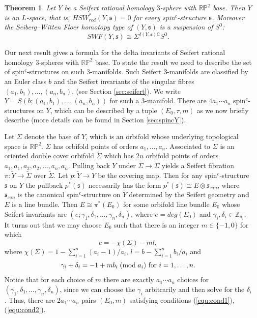 \documentclass{amsart}
\newtheorem{theorem}{Theorem}[section]
\theoremstyle{definition}
\theoremstyle{remark}
\numberwithin{equation}{section}
\begin{document}
\begin{theorem}\label{thm:swfY}
Let $Y$ be a Seifert rational homology $3$-sphere with $\mathbb{RP}^2$ base. Then $Y$ is an $L$-space, that is, $HSW^*_{red}(Y , \mathfrak{s}) = 0$ for every spin$^c$-structure $\mathfrak{s}$. Moreover the Seiberg--Witten Floer homotopy type of $(Y,\mathfrak{s})$ is a suspension of $S^0$:
\[
SWF(Y , \mathfrak{s}) \cong \Sigma^{\delta(Y,\mathfrak{s})\mathbb{C}} S^0.
\]
\end{theorem}

Our next result gives a formula for the delta invariants of Seifert rational homology $3$-spheres with $\mathbb{RP}^2$ base. To state the result we need to describe the set of spin$^c$-structures on such $3$-manifolds. Such Seifert $3$-manifolds are classified by an Euler class $b$ and the Seifert invariants of the singular fibres $(a_1,b_1), \dots , (a_n,b_n)$, (see Section \ref{sec:seifert}). We write $Y = S(b ; (a_1,b_1) , \dots , (a_n,b_n))$ for such a $3$-manifold. There are $4a_1 \cdots a_n$ spin$^c$-structures on $Y$, which can be described by a tuple $(E_0 , \tau , m)$ as we now briefly describe (more details can be found in Section \ref{sec:spincY}).

Let $\Sigma$ denote the base of $Y$, which is an orbifold whose underlying topological space is $\mathbb{RP}^2$. $\Sigma$ has orbifold points of orders $a_1, \dots , a_n$. Associated to $\Sigma$ is an oriented double cover orbifold $\widetilde{\Sigma}$ which has $2n$ orbifold points of orders $a_1,a_1,a_2,a_2 , \dots , a_n,a_n$. Pulling back $Y$ under $\widetilde{\Sigma} \to \Sigma$ yields a Seifert fibration $\pi : \widetilde{Y} \to \widetilde{\Sigma}$ over $\widetilde{\Sigma}$. Let $p : \widetilde{Y} \to Y$ be the covering map. Then for any spin$^c$-structure $\mathfrak{s}$ on $Y$ the pullback $p^*(\mathfrak{s})$ necessarily has the form $p^*(\mathfrak{s}) \cong E \otimes \mathfrak{s}_{can}$, where $\mathfrak{s}_{can}$ is the canonical spin$^c$-structure on $\widetilde{Y}$ determined by the Seifert geometry and $E$ is a line bundle. Then $E \cong \pi^*(E_0)$ for some orbifold line bundle $E_0$ whose Seifert invariants are $( e ; \gamma_1 , \delta_1 , \dots , \gamma_n , \delta_n)$, where $e = deg(E_0)$ and $\gamma_i, \delta_i \in \mathbb{Z}_{a_i}$. It turns out that we may choose $E_0$ such that there is an integer $m \in \{-1,0\}$ for which
\begin{equation}\label{equ:cond1}
e = -\chi(\Sigma) - ml,
\end{equation}
where $\chi(\Sigma) = 1 - \sum_{i=1}^n (a_i - 1)/a_i$, $l = b - \sum_{i=1}^{n} b_i/a_i$ and
\begin{equation}\label{equ:cond2}
\gamma_ i + \delta_i = -1 + m b_i \; ({\rm mod} \; a_i) \text{ for } i = 1, \dots , n.
\end{equation}
Notice that for each choice of $m$ there are exactly $a_1 \cdots a_n$ choices for $(\gamma_1 , \delta_1 , \dots , \gamma_n , \delta_n)$, since we can choose the $\gamma_i$ arbitrarily and then solve for the $\delta_i$. Thus, there are $2a_1 \cdots a_n$ pairs $(E_0 , m)$ satisfying conditions (\ref{equ:cond1}), (\ref{equ:cond2}).
\end{document}
